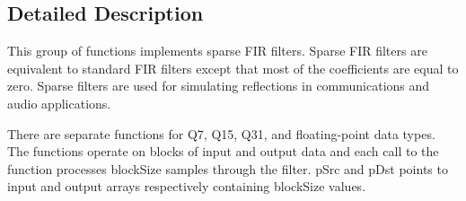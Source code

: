 \subsection{Detailed Description}
This group of functions implements sparse F\-I\-R filters. Sparse F\-I\-R filters are equivalent to standard F\-I\-R filters except that most of the coefficients are equal to zero. Sparse filters are used for simulating reflections in communications and audio applications.

There are separate functions for Q7, Q15, Q31, and floating-\/point data types. The functions operate on blocks of input and output data and each call to the function processes {\ttfamily block\-Size} samples through the filter. {\ttfamily p\-Src} and {\ttfamily p\-Dst} points to input and output arrays respectively containing {\ttfamily block\-Size} values.

